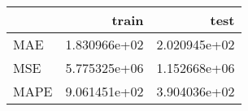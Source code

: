 \begin{tabular}{lrr}
\toprule
{} &         train &          test \\
\midrule
MAE  &  1.830966e+02 &  2.020945e+02 \\
MSE  &  5.775325e+06 &  1.152668e+06 \\
MAPE &  9.061451e+02 &  3.904036e+02 \\
\bottomrule
\end{tabular}
